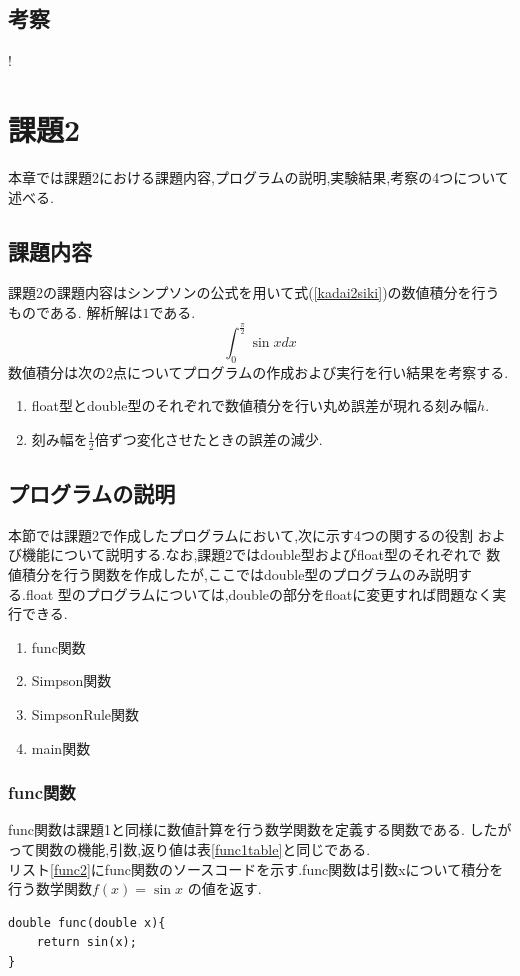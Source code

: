 \documentclass[dvipdfmx]{jarticle}
\begin{document}
    \subsection{考察}
    !
    
    \section{課題2}
    本章では課題2における課題内容,プログラムの説明,実験結果,考察の4つについて述べる.
    \subsection{課題内容}
    課題2の課題内容はシンプソンの公式を用いて式(\ref{kadai2siki})の数値積分を行うものである.
    解析解は$1$である.
    \begin{equation}
      \int_0^\frac{\pi}{2} \sin x dx
          \label{kadai2siki}
        \end{equation}
    数値積分は次の2点についてプログラムの作成および実行を行い結果を考察する.
    \begin{enumerate}
      \item float型とdouble型のそれぞれで数値積分を行い丸め誤差が現れる刻み幅$h$.
      \item 刻み幅を$\frac{1}{2}$倍ずつ変化させたときの誤差の減少.
      \end{enumerate}

    \subsection{プログラムの説明}
    本節では課題2で作成したプログラムにおいて,次に示す4つの関するの役割
    および機能について説明する.なお,課題2ではdouble型およびfloat型のそれぞれで
    数値積分を行う関数を作成したが,ここではdouble型のプログラムのみ説明する.float
    型のプログラムについては,doubleの部分をfloatに変更すれば問題なく実行できる.
    \begin{enumerate}
      \item func関数
      \item Simpson関数
      \item SimpsonRule関数
      \item main関数
      \end{enumerate}
    
    \subsubsection{func関数}
    func関数は課題1と同様に数値計算を行う数学関数を定義する関数である.
    したがって関数の機能,引数,返り値は表\ref{func1table}と同じである.\\
      リスト\ref{func2}にfunc関数のソースコードを示す.func関数は引数xについて積分を行う数学関数$f(x)=\sin x$
      の値を返す.
      \begin{lstlisting}[basicstyle=\ttfamily\footnotesize, frame=single,label=func2,caption=func関数]
double func(double x){
    return sin(x);
} 
            \end{lstlisting}
\end{document}
